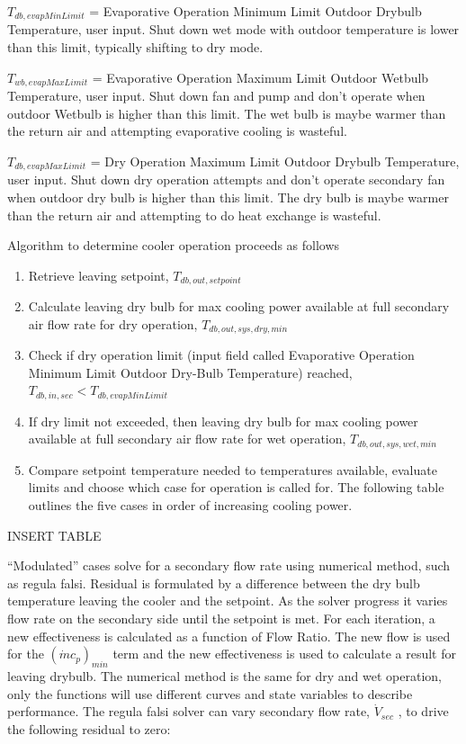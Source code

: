 \(T_{db,evapMinLimit}\) = Evaporative Operation Minimum Limit Outdoor Drybulb Temperature, user input. Shut down wet mode with outdoor temperature is lower than this limit, typically shifting to dry mode.

\(T_{wb,evapMaxLimit}\) = Evaporative Operation Maximum Limit Outdoor Wetbulb Temperature, user input. Shut down fan and pump and don't operate when outdoor Wetbulb is higher than this limit. The wet bulb is maybe warmer than the return air and attempting evaporative cooling is wasteful.

\(T_{db,evapMaxLimit}\) = Dry Operation Maximum Limit Outdoor Drybulb Temperature, user input. Shut down dry operation attempts and don't operate secondary fan when outdoor dry bulb is higher than this limit. The dry bulb is maybe warmer than the return air and attempting to do heat exchange is wasteful.

Algorithm to determine cooler operation proceeds as follows

\begin{enumerate}
\def\labelenumi{\arabic{enumi}.}
\item
  Retrieve leaving setpoint, \(T_{db,out,setpoint}\)
\item
  Calculate leaving dry bulb for max cooling power available at full secondary air flow rate for dry operation, \(T_{db,out,sys,dry,min}\)
\item
  Check if dry operation limit (input field called Evaporative Operation Minimum Limit Outdoor Dry-Bulb Temperature) reached, \(T_{db,in,sec}<T_{db,evapMinLimit}\)
\item
  If dry limit not exceeded, then leaving dry bulb for max cooling power available at full secondary air flow rate for wet operation, \(T_{db,out,sys,wet,min}\)
\item
  Compare setpoint temperature needed to temperatures available, evaluate limits and choose which case for operation is called for. The following table outlines the five cases in order of increasing cooling power.
\end{enumerate}

INSERT TABLE

``Modulated'' cases solve for a secondary flow rate using numerical method, such as regula falsi. Residual is formulated by a difference between the dry bulb temperature leaving the cooler and the setpoint. As the solver progress it varies flow rate on the secondary side until the setpoint is met. For each iteration, a new effectiveness is calculated as a function of Flow Ratio. The new flow is used for the \(\left(\dot{m}c_{p}\right)_{min}\) term and the new effectiveness is used to calculate a result for leaving drybulb. The numerical method is the same for dry and wet operation, only the functions will use different curves and state variables to describe performance. The regula falsi solver can vary secondary flow rate, \(\dot{V}_{sec}\) , to drive the following residual to zero:

